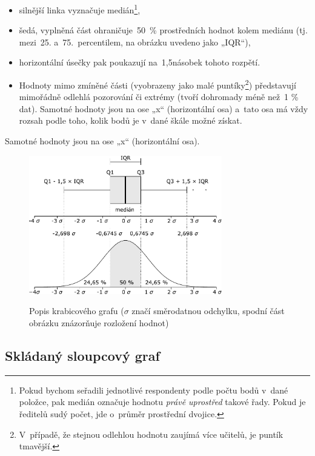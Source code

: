 \documentclass[12pt,a4paper,]{report}
\providecommand{\tightlist}{%
  \setlength{\itemsep}{0pt}\setlength{\parskip}{0pt}}
\begin{document}
\begin{itemize}
\tightlist
\item
  silnější linka vyznačuje medián\footnote{Pokud bychom seřadili jednotlivé respondenty podle počtu bodů v~dané položce, pak medián označuje hodnotu \emph{právě uprostřed} takové řady. Pokud je ředitelů sudý počet, jde o~průměr prostřední dvojice.},
\item
  šedá, vyplněná část ohraničuje~50~\% prostředních hodnot kolem mediánu (tj. mezi~25. a~75.~percentilem, na obrázku uvedeno jako „IQR``),
\item
  horizontální úsečky pak poukazují na~1,5násobek tohoto rozpětí.
\item
  Hodnoty mimo zmíněné části (vyobrazeny jako malé puntíky\footnote{V~případě, že stejnou odlehlou hodnotu zaujímá více učitelů, je puntík tmavější.}) představují mimořádně odlehlá pozorování či extrémy (tvoří dohromady méně než~1 \% dat).
  Samotné hodnoty jsou na ose „x`` (horizontální osa) a~tato osa má vždy rozsah podle toho, kolik bodů je v~dané škále možné získat.
\end{itemize}

Samotné hodnoty jsou na ose „x`` (horizontální osa).

\begin{figure}
{\centering \includegraphics[width=0.75\textwidth]{figures/boxplot_description.pdf}}
\caption{Popis krabicového grafu ($\sigma$ značí směrodatnou odchylku, spodní část obrázku znázorňuje rozložení hodnot)}\label{fig:boxplotDesc}
\end{figure}

\hypertarget{skluxe1danuxfd-sloupcovuxfd-graf}{%
\subsection{Skládaný sloupcový graf}\label{skluxe1danuxfd-sloupcovuxfd-graf}}
\end{document}
